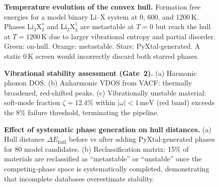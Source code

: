 \documentclass[twocolumn,10pt]{article}
\newcommand{\ehull}{\Delta E_{\mathrm{hull}}}
\begin{document}
\begin{figure}[ht]
\centering
{}
\caption{\textbf{Temperature evolution of the convex hull.}
  Formation free energies for a model binary Li--X system at 0, 600, and
  1200\,K.
  Phases Li$_3$X$_2^*$ and Li$_2$X$_3^\dagger$ are metastable at $T=0$
  but reach the hull at $T = 1200\,\mathrm{K}$ due to larger vibrational entropy
  and partial disorder.
  Green: on-hull. Orange: metastable. Stars: PyXtal-generated.
  A static 0\,K screen would incorrectly discard both starred phases.}
\label{fig:hull}
\end{figure}

\begin{figure}[ht]
\centering
{}
\caption{\textbf{Vibrational stability assessment (Gate~2).}
  (a) Harmonic phonon DOS.
  (b) Anharmonic VDOS from VACF: thermally broadened, red-shifted peaks.
  (c) Vibrationally unstable material: soft-mode fraction
  $\zeta = 12.4\%$ within $|\omega| < 1\,\mathrm{meV}$ (red band)
  exceeds the 8\% failure threshold, terminating the pipeline.}
\label{fig:vdos}
\end{figure}

\begin{figure}[ht]
\centering
{}
\caption{\textbf{Effect of systematic phase generation on hull distances.}
  (a) Hull distance $\ehull$ before vs after adding PyXtal-generated phases
  for 80 model candidates.
  (b) Reclassification matrix: 15\% of materials are reclassified as
  ``metastable'' or ``unstable'' once the competing-phase space is systematically
  completed, demonstrating that incomplete databases overestimate stability.}
\label{fig:coverage}
\end{figure}
\end{document}
